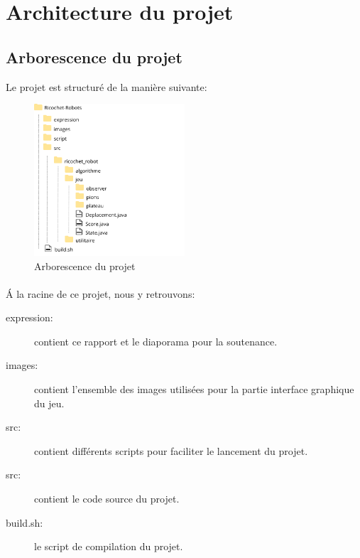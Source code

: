 \documentclass[a4paper, 12pt]{article}
\begin{document}
\newpage %

\section{Architecture du projet}
    \subsection{Arborescence du projet}
    
        Le projet est structuré de la manière suivante:
        
        \begin{figure}[H]
    		\centering\includegraphics[width=0.5\textwidth]{images/structureProjet.png}
    		\caption{Arborescence du projet}
    	\end{figure}
    	
    	\paragraph{}
    	Á la racine de ce projet, nous y retrouvons:
    	
    	\begin{description}
    	    \item [expression:] contient ce rapport et le diaporama pour la soutenance.
    	    \item [images:] contient l'ensemble des images utilisées pour la partie interface graphique du jeu.
    	    \item [src:] contient différents scripts pour faciliter le lancement du projet.
    	    \item [src:] contient le code source du projet.
    	    \item [build.sh:] le script de compilation du projet.
    	\end{description}
    	
\end{document}
